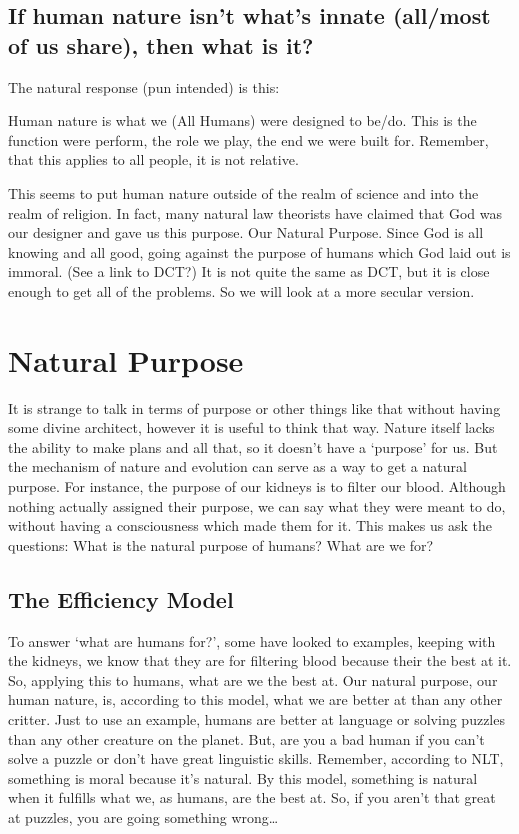 \subsection{If human nature isn’t what’s innate (all/most of us share), then what is it?}

The natural response (pun intended) is this:

\begin{center}
Human nature is what we (All Humans) were designed to be/do. This is the function were perform, the role we play, the end we were built for. Remember, that this applies to all people, it is not relative.
\end{center}

This seems to put human nature outside of the realm of science and into the realm of religion. In fact, many natural law theorists have claimed that God was our designer and gave us this purpose. Our Natural Purpose. Since God is all knowing and all good, going against the purpose of humans which God laid out is immoral. (See a link to DCT?) It is not quite the same as DCT, but it is close enough to get all of the problems. So we will look at a more secular version.

\section{Natural Purpose}

It is strange to talk in terms of purpose or other things like that without having some divine architect, however it is useful to think that way. Nature itself lacks the ability to make plans and all that, so it doesn’t have a ‘purpose’ for us. But the mechanism of nature and evolution can serve as a way to get a natural purpose. For instance, the purpose of our kidneys is to filter our blood. Although nothing actually assigned their purpose, we can say what they were meant to do, without having a consciousness which made them for it. This makes us ask the questions: What is the natural purpose of humans? What are we for?

\subsection{The Efficiency Model}

To answer ‘what are humans for?’, some have looked to examples, keeping with the kidneys, we know that they are for filtering blood because their the best at it. So, applying this to humans, what are we the best at. Our natural purpose, our human nature, is, according to this model, what we are better at than any other critter. Just to use an example, humans are better at language or solving puzzles than any other creature on the planet. But, are you a bad human if you can’t solve a puzzle or don’t have great linguistic skills. Remember, according to NLT, something is moral because it’s natural. By this model, something is natural when it fulfills what we, as humans, are the best at. So, if you aren’t that great at puzzles, you are going something wrong…

